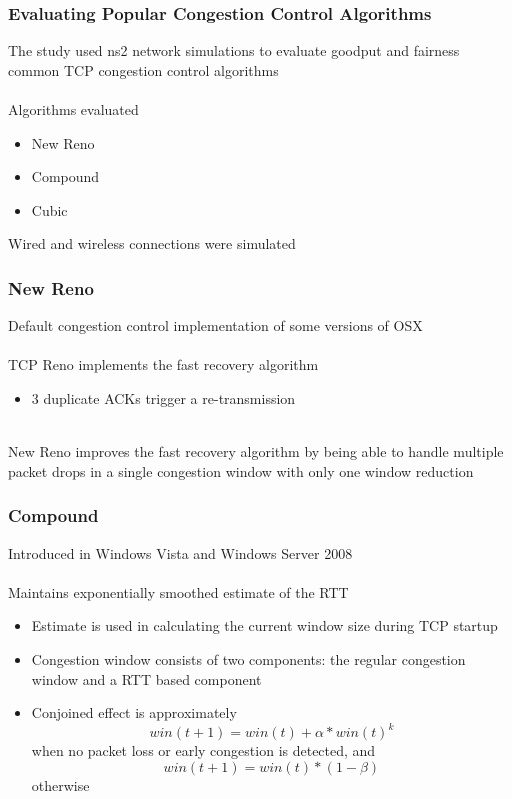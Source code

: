 \documentclass{beamer}
\begin{document}
\begin{frame}
\frametitle{Evaluating Popular Congestion Control Algorithms}
The study used ns2 network simulations to evaluate goodput and fairness common TCP congestion control algorithms\\~\\

Algorithms evaluated
\begin{itemize}
	\item New Reno
	\item Compound
	\item Cubic
\end{itemize}

Wired and wireless connections were simulated
\end{frame}

\begin{frame}
\frametitle{New Reno}
Default congestion control implementation of some versions of OSX\\~\\

TCP Reno implements the fast recovery algorithm
\begin{itemize}
	\item 3 duplicate ACKs trigger a re-transmission\\~\\
\end{itemize}

New Reno improves the fast recovery algorithm by being able to handle multiple packet drops in a single congestion window with only one window reduction
\end{frame}

\begin{frame}
\frametitle{Compound}
Introduced in Windows Vista and Windows Server 2008\\~\\

Maintains exponentially smoothed estimate of the RTT 
\begin{itemize}
	\item Estimate is used in calculating the current window size during TCP startup
	\item Congestion window consists of two components: the regular congestion window and a RTT based component
	\item Conjoined effect is approximately
	\[
		win(t + 1) = win(t) + \alpha * win(t)^k
	\]
	when no packet loss or early congestion is detected, and
	\[
		win(t + 1) = win(t) * (1 - \beta)
	\]	
	otherwise
	  
\end{itemize}

\end{frame}
\end{document}
